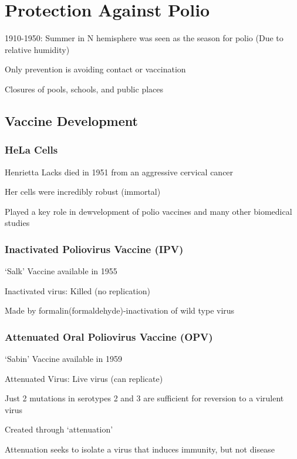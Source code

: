\documentclass{notes}
\begin{document}
\section{Protection Against Polio}

1910-1950: Summer in N hemisphere was seen as the season for polio (Due to relative humidity)

\tab Only prevention is avoiding contact or vaccination

\tab \indicates Closures of pools, schools, and public places

\subsection{Vaccine Development}

\subsubsection{HeLa Cells}

Henrietta Lacks died in 1951 from an aggressive cervical cancer

\tab Her cells were incredibly robust (immortal)

\tab \indicates Played a key role in dewvelopment of polio vaccines and many other biomedical studies

\subsubsection{Inactivated Poliovirus Vaccine (IPV)}

`Salk' Vaccine available in 1955

Inactivated virus: Killed (no replication)

Made by formalin(formaldehyde)-inactivation of wild type virus

\subsubsection{Attenuated Oral Poliovirus Vaccine (OPV)}

`Sabin' Vaccine available in 1959

Attenuated Virus: Live virus (can replicate)

\tab Just 2 mutations in serotypes 2 and 3 are sufficient for reversion to a virulent virus

Created through `attenuation'

\tab Attenuation seeks to isolate a virus that induces immunity, but not disease
\end{document}
